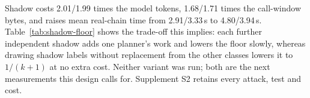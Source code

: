 Shadow costs 2.01/1.99 times the model tokens, 1.68/1.71 times the call-window bytes, and raises mean real-chain time from 2.91/3.33\,s to 4.80/3.94\,s. Table~\ref{tab:shadow-floor} shows the trade-off this implies: each further independent shadow adds one planner's work and lowers the floor slowly, whereas drawing shadow labels without replacement from the other classes lowers it to $1/(k+1)$ at no extra cost. Neither variant was run; both are the next measurements this design calls for. Supplement S2 retains every attack, test and cost.
